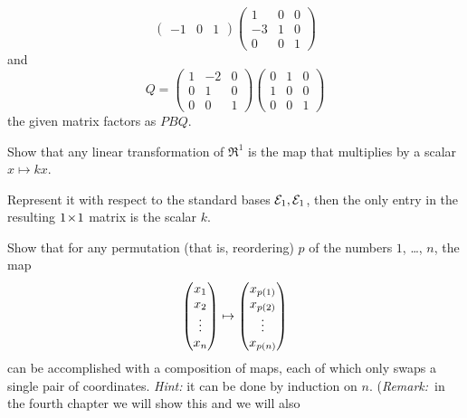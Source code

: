 \begin{exercises}
\begin{answer}
\begin{equation*}
\begin{pmatrix}
         -1  &0  &1         
        \end{pmatrix}
        \begin{pmatrix}
          1  &0  &0  \\
         -3  &1  &0  \\
          0  &0  &1         
        \end{pmatrix}
      \end{equation*}
      and 
      \begin{equation*}
        Q=
        \begin{pmatrix}
          1  &-2    &0  \\
          0  &1     &0  \\
          0  &0     &1         
        \end{pmatrix}
        \begin{pmatrix}
          0  &1     &0  \\
          1  &0     &0  \\
          0  &0     &1         
        \end{pmatrix}
      \end{equation*}
      the given matrix factors as $PBQ$.
    \end{answer}
  \item \label{exer:RToRIsScalMult} 
    Show that any linear transformation of $\Re^1$ is the map
    that multiplies by a scalar $x\mapsto kx$.
    \begin{answer}
      Represent it with respect to the 
      standard bases ${\cal E}_1,{\cal E}_1$, then the
      only entry in the resulting $1 \! \times \! 1$ matrix is the scalar $k$.
    \end{answer}
  \item \label{exer:PermIsCompSwaps}
    Show that for any permutation  
    (that is, reordering) $p$ of the numbers
    $1$, \ldots, $n$, the map 
    \begin{equation*}
      \begin{pmatrix} x_1 \\ x_2 \\ \vdots \\ x_n \end{pmatrix}
      \mapsto
      \begin{pmatrix} x_{p(1)} \\ x_{p(2)} \\ \vdots \\ x_{p(n)} \end{pmatrix}
    \end{equation*}
    can be accomplished with a composition of maps, 
    each of which only swaps a single pair of coordinates.
    \textit{Hint:} it can be done by induction on $n$.
    (\textit{Remark:}~in the fourth chapter we will show this and we will also 

\end{exercises}

